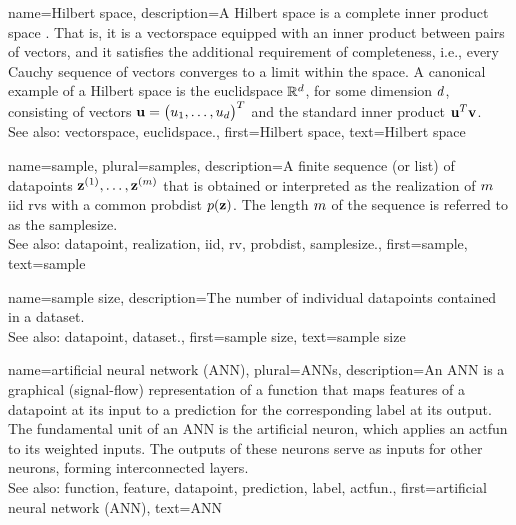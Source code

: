 {name={Hilbert space},
	description={A Hilbert space is a complete inner 
		product space \cite{introhilbertbook}. That is, it is a \gls{vectorspace} equipped 
		with an inner product between pairs of vectors, and it satisfies the additional requirement 
		of completeness, i.e., every Cauchy sequence of vectors converges to a limit within the space. 
		A canonical example of a Hilbert space is the \gls{euclidspace} $\mathbb{R}^{d}$, 
		for some dimension $d$, consisting of vectors ${\bf u} = \big(u_1, \ldots, u_{d}\big)^T$ 
		and the standard inner product ${\bf u}^T {\bf v}$.
				\\
		See also: \gls{vectorspace}, \gls{euclidspace}.},
	first={Hilbert space},
	text={Hilbert space}
}



{name={sample}, plural={samples}, 
	description={A 
		finite sequence (or list) of \glspl{datapoint} ${\bf z}^{(1)}, \ldots, {\bf z}^{(m)}$ that 
		is obtained or interpreted as the \gls{realization} of $m$ \gls{iid} \glspl{rv} 
		with a common \gls{probdist} $p({\bf z})$. The length $m$ of 
		the sequence is referred to as the \gls{samplesize}.
				\\
		See also: \gls{datapoint}, \gls{realization}, \gls{iid}, \gls{rv}, \gls{probdist}, \gls{samplesize}.},
		first={sample},
		text={sample}
}
	
{name={sample size},
	description={The number of individual \glspl{datapoint} 
		contained in a \gls{dataset}.
				\\
		See also: \gls{datapoint}, \gls{dataset}.},
	first={sample size},
	text={sample size}
}

{name={artificial neural network (ANN)}, plural={ANNs},
	description={An ANN 
		is a graphical (signal-flow) representation of a \gls{function} that maps 
		\glspl{feature} of a \gls{datapoint} at its input to a \gls{prediction} 
		for the corresponding \gls{label} at its output. The fundamental unit of an 
		ANN is the artificial neuron, which applies an \gls{actfun} to its 
		weighted inputs. The outputs of these neurons serve as inputs for other neurons, 
		forming interconnected layers.
				\\
		See also: \gls{function}, \gls{feature}, \gls{datapoint}, \gls{prediction}, \gls{label}, \gls{actfun}.},
	first={artificial neural network (ANN)},
	text={ANN}
}


